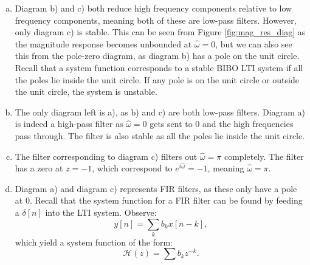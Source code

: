 \begin{enumerate}
\begin{enumerate}[a)]
              \item Diagram b) and c) both reduce high frequency components relative to low frequency components,
                    meaning both of these are low-pass filters. However, only diagram c) is stable.
                    This can be seen from Figure \ref{fig:mag_res_diag} as the magnitude response becomes unbounded at $\hat{\omega}=0$,
                    but we can also see this from the pole-zero diagram, as diagram b) has a pole on the unit circle. Recall that a system
                    function corresponds to a stable BIBO LTI system if all the poles lie inside the unit circle. If any pole is on
                    the unit circle or outside the unit circle, the system is unstable.

              \item The only diagram left is a), as b) and c) are both low-pass filters.
                    Diagram a) is indeed a high-pass filter as $\hat{\omega}=0$ gets sent to $0$ and the high frequencies pass through.
                    The filter is also stable as all the poles lie inside the unit circle.

              \item The filter corresponding to diagram c) filters out $\hat{\omega} = \pi$ completely.
                    The filter has a zero at $z = -1$, which correspond to $e^{i\hat{\omega}} = -1$, meaning
                    $\hat{\omega} = \pi$.

              \item Diagram a) and diagram c) represents FIR filters, as these only have a pole at $0$.
                    Recall that the system function for a FIR filter can be found by feeding
                    a $\delta[n]$ into the LTI system. Observe:
                    \[y[n] = \sum_k b_k x[n-k],\]
                    which yield a system function of the form:
                    \[\mathcal{H}(z) = \sum b_{k}z^{-k}.\]

          \end{enumerate}
\end{enumerate}
